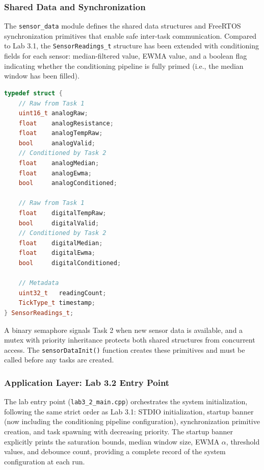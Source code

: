 \subsubsection{Shared Data and Synchronization}

The \texttt{sensor\_data} module defines the shared data structures and FreeRTOS synchronization primitives that enable safe inter-task communication. Compared to Lab 3.1, the \texttt{SensorReadings\_t} structure has been extended with conditioning fields for each sensor: median-filtered value, EWMA value, and a boolean flag indicating whether the conditioning pipeline is fully primed (i.e., the median window has been filled).

\begin{lstlisting}[language=C++, caption=Extended shared data structures (sensor\_data.h --- excerpt), label=lst:sensor_data_h]
typedef struct {
    // Raw from Task 1
    uint16_t analogRaw;
    float    analogResistance;
    float    analogTempRaw;
    bool     analogValid;
    // Conditioned by Task 2
    float    analogMedian;
    float    analogEwma;
    bool     analogConditioned;

    // Raw from Task 1
    float    digitalTempRaw;
    bool     digitalValid;
    // Conditioned by Task 2
    float    digitalMedian;
    float    digitalEwma;
    bool     digitalConditioned;

    // Metadata
    uint32_t   readingCount;
    TickType_t timestamp;
} SensorReadings_t;
\end{lstlisting}

A binary semaphore signals Task 2 when new sensor data is available, and a mutex with priority inheritance protects both shared structures from concurrent access. The \texttt{sensorDataInit()} function creates these primitives and must be called before any tasks are created.

\subsubsection{Application Layer: Lab 3.2 Entry Point}

The lab entry point (\texttt{lab3\_2\_main.cpp}) orchestrates the system initialization, following the same strict order as Lab 3.1: STDIO initialization, startup banner (now including the conditioning pipeline configuration), synchronization primitive creation, and task spawning with decreasing priority. The startup banner explicitly prints the saturation bounds, median window size, EWMA $\alpha$, threshold values, and debounce count, providing a complete record of the system configuration at each run.


